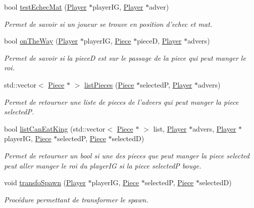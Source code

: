 \begin{DoxyCompactItemize}
bool \hyperlink{class_chess_a591da78c202b3e870c683789662a65c4}{test\-Echec\-Mat} (\hyperlink{class_player}{Player} $\ast$player\-I\-G, \hyperlink{class_player}{Player} $\ast$adver)
\begin{DoxyCompactList}\small\item\em Permet de savoir si un joueur se trouve en position d'echec et mat. \end{DoxyCompactList}\item 
bool \hyperlink{class_chess_a7b2dde25a7cbe133dbb0fa9e71909e8f}{on\-The\-Way} (\hyperlink{class_player}{Player} $\ast$player\-I\-G, \hyperlink{class_piece}{Piece} $\ast$piece\-D, \hyperlink{class_player}{Player} $\ast$advers)
\begin{DoxyCompactList}\small\item\em Permet de savoir si la piece\-D est sur le passage de la piece qui peut manger le roi. \end{DoxyCompactList}\item 
std\-::vector$<$ \hyperlink{class_piece}{Piece} $\ast$ $>$ \hyperlink{class_chess_ac70f9b16162244c5ab75e93b52db2024}{list\-Pieces} (\hyperlink{class_piece}{Piece} $\ast$selected\-P, \hyperlink{class_player}{Player} $\ast$advers)
\begin{DoxyCompactList}\small\item\em Permet de retourner une liste de pieces de l'advers qui peut manger la piece selected\-P. \end{DoxyCompactList}\item 
bool \hyperlink{class_chess_a860115fe5245b5d361ccb3ce7ea545b6}{list\-Can\-Eat\-King} (std\-::vector$<$ \hyperlink{class_piece}{Piece} $\ast$ $>$ list, \hyperlink{class_player}{Player} $\ast$advers, \hyperlink{class_player}{Player} $\ast$player\-I\-G, \hyperlink{class_piece}{Piece} $\ast$selected\-P, \hyperlink{class_piece}{Piece} $\ast$selected\-D)
\begin{DoxyCompactList}\small\item\em Permet de retourner un bool si une des pieces que peut manger la piece selected peut aller manger le roi du player\-I\-G si la piece selected\-P bouge. \end{DoxyCompactList}\item 
void \hyperlink{class_chess_a29329920258b662de0bdac41ba547f57}{transfo\-Spawn} (\hyperlink{class_player}{Player} $\ast$player\-I\-G, \hyperlink{class_piece}{Piece} $\ast$selected\-P, \hyperlink{class_piece}{Piece} $\ast$selected\-D)
\begin{DoxyCompactList}\small\item\em Procédure permettant de transformer le spawn. \end{DoxyCompactList}\item 

\end{DoxyCompactItemize}
